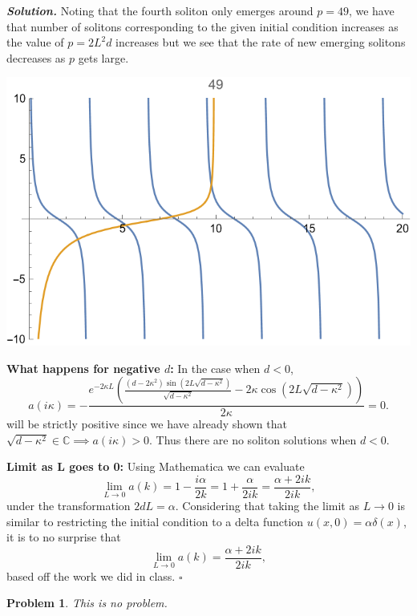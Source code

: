 \documentclass[12pt]{report}
\newtheorem{problem}{Problem}
\newenvironment{solution}[1][\it{Solution}]{\textbf{#1. } }{$\square$}
\def\C{{\mathbb C}}
\begin{document}
\begin{solution}
    Noting that the fourth soliton only emerges around $p=49$, we have that number of solitons corresponding to the given initial condition increases as the value of $p = 2L^2d$ increases but we see that the rate of new emerging solitons decreases as $p$ gets large.
    \begin{center}
        \includegraphics[width=.6\textwidth]{plots/case4.png}
    \end{center} 
    \noindent
    {\bf What happens for negative $d$:}
    In the case when $d < 0$, 
    \[ 
        a(i\kappa) = -\frac{e^{-2 \kappa  L} \left(\frac{\left(d-2 \kappa ^2\right) \sin \left(2 L \sqrt{d-\kappa ^2}\right)}{\sqrt{d-\kappa ^2}}-2 \kappa  \cos \left(2 L \sqrt{d-\kappa ^2}\right)\right)}{2 \kappa } = 0.
    \]
    will be strictly positive since we have already shown that $\sqrt{d - \kappa^2} \in \C \implies a(i\kappa) > 0$. Thus there are no soliton solutions when $d < 0$. 

    \noindent
    {\bf Limit as L goes to 0:}
    Using Mathematica we can evaluate
    \[ \lim_{L \to 0} a(k) = 1 - \frac{i \alpha}{2k} = 1 + \frac{\alpha}{2ik} = \frac{\alpha + 2 i k}{2 i k},\]
    under the transformation $2dL = \alpha$. Considering that taking the limit as $L \to 0$ is similar to restricting the initial condition to a delta function $u(x,0) = \alpha \delta(x)$, it is to no surprise that
    \[ \lim_{L \to 0} a(k) = \frac{\alpha + 2 i k}{2 i k},\]
    based off the work we did in class.
\end{solution}

\newpage



\begin{problem}
    This is no problem.
\end{problem}
\end{document}

